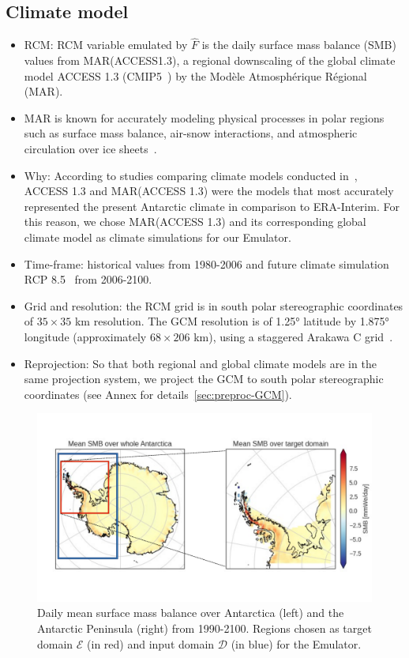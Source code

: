 \documentclass[a4paper,11pt,oneside]{report}
\begin{document}
\subsection{Climate model}
\begin{itemize}
   \item RCM: RCM variable emulated by $\hat{F}$ is the daily surface mass balance (SMB) values from MAR(ACCESS1.3), a regional downscaling of the global climate model ACCESS 1.3 (CMIP5~\cite{ACCESS13, CMIP5}) by the Modèle Atmosphérique Régional (MAR). 
    \item MAR is known for accurately modeling physical processes in polar regions such as surface mass balance, air-snow interactions, and atmospheric circulation over ice sheets~\cite{MAR}. 
    \item Why: According to studies comparing climate models conducted in~\cite{Kittel, Agosta2015}, ACCESS 1.3 and MAR(ACCESS 1.3) were the models that most accurately represented the present Antarctic climate in comparison to ERA-Interim. For this reason, we chose MAR(ACCESS 1.3) and its corresponding global climate model as climate simulations for our Emulator.  
    \item Time-frame: historical values from 1980-2006 and future climate simulation RCP 8.5~\cite{Moss2010} from 2006-2100. 
    \item Grid and resolution: the RCM grid is in south polar stereographic coordinates of $35 \times 35$ \si{km} resolution. The GCM resolution is of 1.25° latitude by 1.875° longitude (approximately $68 \times 206$ \si{km}), using a staggered Arakawa C grid~\cite{ACCESS13, ACCESS13_2}. 
    \item Reprojection: So that both regional and global climate models are in the same projection system, we project the GCM to south polar stereographic coordinates (see Annex for details~\ref{sec:preproc-GCM}). 
\end{itemize}

\begin{figure}[!t]
  \centering
  \includegraphics[width=\columnwidth]{images/domains.pdf}
  \caption []{\small Daily mean surface mass balance over Antarctica (left) and the Antarctic Peninsula (right) from 1990-2100. Regions chosen as target domain $\mathcal{E}$ (in red) and input domain $\mathcal{D}$ (in blue) for the Emulator.}
  \vspace{-3mm}
    \label{fig:region-of-choice}
\end{figure}
\end{document}
